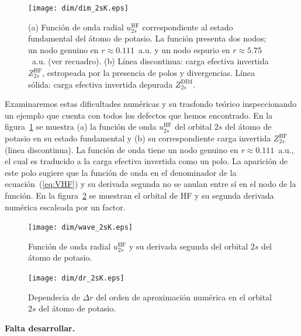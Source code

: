 \begin{figure}[t]
\centering
\texttt{[image: dim/dim\_2sK.eps]} 
\caption[Función de onda radial y carga efectiva correspondiente.]
{(a) Función de onda radial $u_{2s}^{\mathrm{HF}}$ 
correspondiente al estado fundamental del átomo de potasio.
La función presenta dos nodos; un nodo genuino en $r \approx 0.111$~a.u. 
y un nodo espurio en $r\approx 5.75$~a.u. (ver recuadro). 
(b) Línea discontinua: carga efectiva invertida $Z_{2s}^{\mathrm{HF}}$, 
estropeada por la presencia de polos y divergencias.
Línea sólida: carga efectiva invertida depurada $Z_{2s}^{\mathrm{DIM}}$.}
\label{fig:2sK}
\end{figure}

Examinaremos estas dificultades numéricas y su trasfondo teórico 
inspeccionando un ejemplo que cuenta con todos los defectos que hemos 
encontrado. En la figura~\ref{fig:2sK} se muestra (a) la función de 
onda $u_{2s}^{\mathrm{HF}}$ del orbital $2s$ del átomo de potasio en su 
estado fundamental y (b) su correspondiente carga invertida 
$Z_{2s}^{\mathrm{HF}}$ (linea discontinua). La función de onda tiene un 
nodo genuino en $r\approx 0.111$~a.u., el cual es traducido a la carga 
efectiva invertida como un polo. La aparición de este polo sugiere que 
la función de onda en el denominador de la ecuación~(\ref{eq:VHF}) y su 
derivada segunda no se anulan entre sí en el nodo de la función. En la 
figura~\ref{fig:wave2sK} se muestran el orbital de HF y su segunda 
derivada numérica escaleada por un factor. 


\begin{figure}
\centering
\texttt{[image: dim/wave\_2sK.eps]} 
\caption[Función de onda radial y su derivada segunda de K.]
{Función de onda radial $u_{2s}^{\mathrm{HF}}$ y su derivada segunda 
del orbital $2s$ del átomo de potasio.}
\label{fig:wave2sK}
\end{figure}


\begin{figure}
\centering
\texttt{[image: dim/dr\_2sK.eps]} 
\caption[Dependecia de $\Delta r$ del orden de aproximación numérica.]
{Dependecia de $\Delta r$ del orden de aproximación numérica en el 
orbital $2s$ del átomo de potasio.}
\label{fig:dr2sK}
\end{figure}

\vspace{1cm}


\noindent
{\bf \color{red} Falta desarrollar.}

